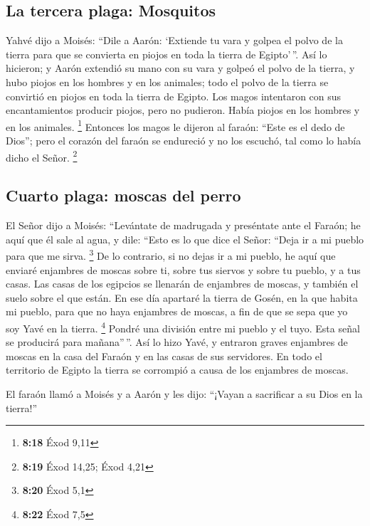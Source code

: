 \hypertarget{la-tercera-plaga-mosquitos}{%
\subsection{La tercera plaga:
Mosquitos}\label{la-tercera-plaga-mosquitos}}

 Yahvé dijo a Moisés: ``Dile a Aarón: `Extiende tu vara y
golpea el polvo de la tierra para que se convierta en piojos en toda la
tierra de Egipto'\,''.  Así lo hicieron; y Aarón extendió
su mano con su vara y golpeó el polvo de la tierra, y hubo piojos en los
hombres y en los animales; todo el polvo de la tierra se convirtió en
piojos en toda la tierra de Egipto.  Los magos intentaron
con sus encantamientos producir piojos, pero no pudieron. Había piojos
en los hombres y en los animales. \footnote{\textbf{8:18} Éxod 9,11}
 Entonces los magos le dijeron al faraón: ``Este es el
dedo de Dios''; pero el corazón del faraón se endureció y no los
escuchó, tal como lo había dicho el Señor. \footnote{\textbf{8:19} Éxod
  14,25; Éxod 4,21}

\hypertarget{cuarto-plaga-moscas-del-perro}{%
\subsection{Cuarto plaga: moscas del
perro}\label{cuarto-plaga-moscas-del-perro}}

 El Señor dijo a Moisés: ``Levántate de madrugada y
preséntate ante el Faraón; he aquí que él sale al agua, y dile: ``Esto
es lo que dice el Señor: ``Deja ir a mi pueblo para que me sirva.
\footnote{\textbf{8:20} Éxod 5,1}  De lo contrario, si no
dejas ir a mi pueblo, he aquí que enviaré enjambres de moscas sobre ti,
sobre tus siervos y sobre tu pueblo, y a tus casas. Las casas de los
egipcios se llenarán de enjambres de moscas, y también el suelo sobre el
que están.  En ese día apartaré la tierra de Gosén, en la
que habita mi pueblo, para que no haya enjambres de moscas, a fin de que
se sepa que yo soy Yavé en la tierra. \footnote{\textbf{8:22} Éxod 7,5}
 Pondré una división entre mi pueblo y el tuyo. Esta
señal se producirá para mañana''\,''.  Así lo hizo Yavé,
y entraron graves enjambres de moscas en la casa del Faraón y en las
casas de sus servidores. En todo el territorio de Egipto la tierra se
corrompió a causa de los enjambres de moscas.

 El faraón llamó a Moisés y a Aarón y les dijo: ``¡Vayan
a sacrificar a su Dios en la tierra!''

